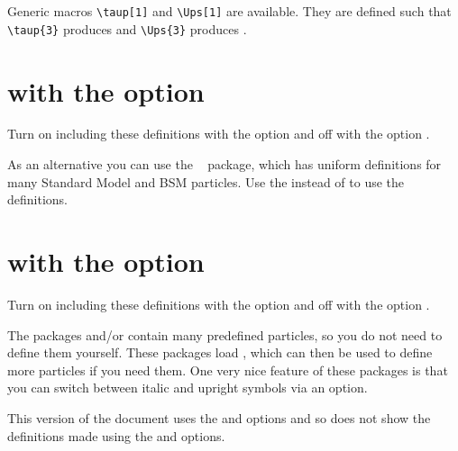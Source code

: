 \documentclass[REPORT=false, mhchem, UKenglish]{atlasdoc}
\begin{document}
Generic macros \verb|\taup[1]| and \verb|\Ups[1]| are available.
They are defined such that
\verb|\taup{3}| produces  and
\verb|\Ups{3}| produces .




\newpage
\section{ with the  option}

Turn on including these definitions with the option  and off with the option .

As an alternative you can use the ~\cite{hepparticles} package,
which has uniform definitions for many Standard Model and BSM particles.
Use the  instead of  to use the  definitions.




\newpage
\section{ with the  option}

Turn on including these definitions with the option  and off with the option .

The packages  and/or  contain many predefined particles,
so you do not need to define them yourself.
These packages load , which can then be used to define more particles if you need them.
One very nice feature of these packages is that you can switch between italic and upright symbols via an option.

This version of the document uses the  and  options and so
does not show the definitions made using the  and  options.
%







\printbibliography
\end{document}

